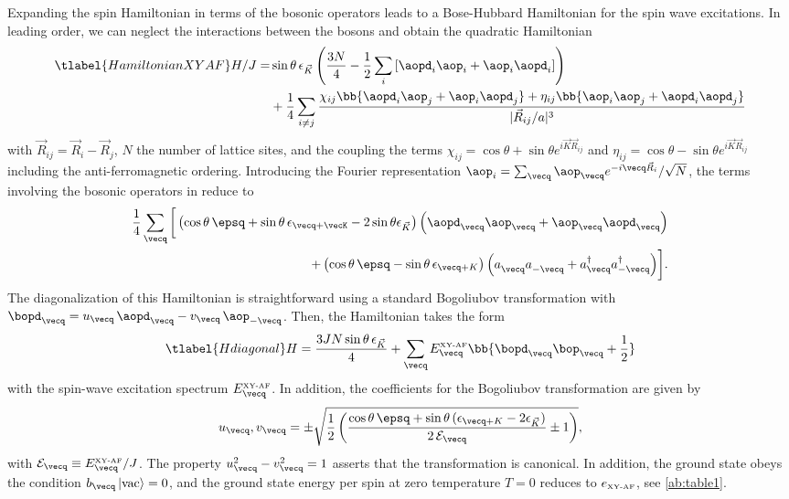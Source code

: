 Expanding the spin Hamiltonian in terms of the bosonic operators leads to a Bose-Hubbard Hamiltonian for the spin wave excitations.
In leading order, we can neglect the interactions between the bosons and obtain the quadratic Hamiltonian
%
\begin{align} \tlabel{HamiltonianXYAF}
H/J = &\sin \theta \, \epsilon_{\vec K} \left(\frac{3 N}{4} - \frac{1}{2}\sum_i\left[\aopd_{i}\aop_i+ \aop_i \aopd_{i}\right]\right) \\
           &+  \frac{1}{4} \sum_{i\ne j} \frac{
    \chi_{i j} \bb{ \aopd_{i} \aop_{j}  + \aop_{i} \aopd_{j} }
  + \eta_{i j} \bb{ \aop_{i} \aop_{j}  + \aopd_{i} \aopd_{j} }
}{|{\vec R}_{ij}/a|^3}
\end{align}
with  ${\vec R}_{ij}={\vec R}_i - {\vec R}_j$,  $N$ the number of lattice sites, and the coupling the terms
$\chi_{i j}=\cos\theta+\sin\theta e^{i {\vec K} {\vec R}_{ij}}$ and $\eta_{i j}=\cos\theta-\sin\theta e^{i {\vec K} {\vec R}_{ij}}$ including the
 anti-ferromagnetic ordering.
Introducing the  Fourier representation $\aop_i =  \sum_{\vecq} \aop_{\vecq}e^{-i {\vecq} {\vec R}_i}/\sqrt{N}$,
the terms involving the bosonic operators in  reduce to
%
\begin{align}
\frac{1}{4} \sum_{\vecq} \bigg[
\left( \cos\theta \, \epsq +\sin\theta \, \epsilon_{\vecq+\vecK} - 2 \sin \theta \epsilon_{\vec K}\right)\Big(\aopd_{\vecq} \aop_{\vecq}  + \aop_{\vecq} \aopd_{\vecq}\Big) \\
+\left( \cos\theta \, \epsq-\sin\theta \, \epsilon_{\vecq+K} \right)\Big(a^{\phantom\dag}_{\vecq} a^{\phantom\dag}_{-\vecq}
+ a^{\dag}_{\vecq} a^{\dag}_{-{\vecq}} \Big) \bigg].
\end{align}
%
The diagonalization of this Hamiltonian is straightforward using a standard Bogoliubov transformation
with $\bopd_{\vecq} = u_{\vecq}\, \aopd_{\vecq} - v_{\vecq}\, \aop_{-\vecq}$.
Then, the Hamiltonian takes the form
%
\begin{align} \tlabel{Hdiagonal}
H = \frac{3J N \sin \theta\, \epsilon_{\vec K}}{4}  + \sum_{\vecq} E^{\mbox{\tiny XY-AF}}_{\vecq} \bb{\bopd_{\vecq}\bop_{\vecq} + \frac{1}{2}}
\end{align}
%
with the spin-wave excitation spectrum $E^{\mbox{\tiny XY-AF}}_{\vecq}$. In addition, the coefficients  for the Bogoliubov transformation
are given by
%
\begin{align}
u_{\vecq} , v_{\vecq} = \pm\sqrt{\frac{1}{2} \left( \frac{\cos\theta \, \epsq +\sin\theta \, (\epsilon_{\vecq+K} - 2 \epsilon_{\vec K})}{2\, \mathcal{E}_{\vecq}}\pm 1\right)},
\end{align}
%
with $\mathcal{E}_{\vecq} \equiv E^{\mbox{\tiny XY-AF}}_{\vecq} / J $.
The property $u^2_{\vecq}-v^2_{\vecq}=1$ asserts that the transformation is canonical.
In addition, the ground state obeys the condition $b_{\vecq} \left|\text{vac}\right\rangle = 0$, and the ground state energy per spin at zero temperature $T=0$
reduces to $e_{\mbox{\tiny XY-AF}}$, see \cref{ab:table1}.

